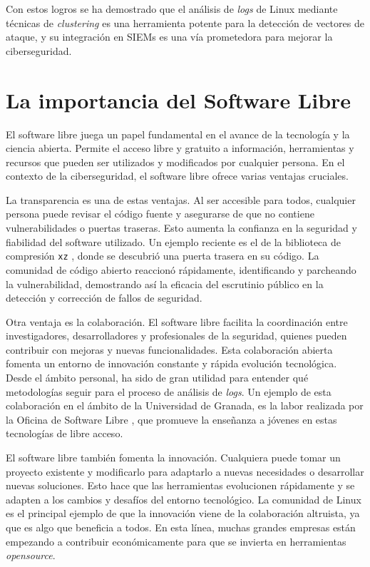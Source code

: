 Con estos logros se ha demostrado que el análisis de \textit{logs} de Linux mediante técnicas de \textit{clustering} es una herramienta potente para la detección de vectores de ataque, y su integración en \gls{SIEM}s es una vía prometedora para mejorar la ciberseguridad.


\newpage

\section{La importancia del Software Libre}

El software libre juega un papel fundamental en el avance de la tecnología y la ciencia abierta. Permite el acceso libre y gratuito a información, herramientas y recursos que pueden ser utilizados y modificados por cualquier persona. En el contexto de la ciberseguridad, el software libre ofrece varias ventajas cruciales.

La transparencia es una de estas ventajas. Al ser accesible para todos, cualquier persona puede revisar el código fuente y asegurarse de que no contiene vulnerabilidades o puertas traseras. Esto aumenta la confianza en la seguridad y fiabilidad del software utilizado. Un ejemplo reciente es el de la biblioteca de compresión \texttt{xz} \cite{goodin2024xzbackdoor}, donde se descubrió una puerta trasera en su código. La comunidad de código abierto reaccionó rápidamente, identificando y parcheando la vulnerabilidad, demostrando así la eficacia del escrutinio público en la detección y corrección de fallos de seguridad.

Otra ventaja es la colaboración. El software libre facilita la coordinación entre investigadores, desarrolladores y profesionales de la seguridad, quienes pueden contribuir con mejoras y nuevas funcionalidades. Esta colaboración abierta fomenta un entorno de innovación constante y rápida evolución tecnológica. Desde el ámbito personal, ha sido de gran utilidad para entender qué metodologías seguir para el proceso de análisis de \textit{logs}. Un ejemplo de esta colaboración en el ámbito de la Universidad de Granada, es la labor realizada por la Oficina de Software Libre \cite{oslugr}, que promueve la enseñanza a jóvenes en estas tecnologías de libre acceso.

El software libre también fomenta la innovación. Cualquiera puede tomar un proyecto existente y modificarlo para adaptarlo a nuevas necesidades o desarrollar nuevas soluciones. Esto hace que las herramientas evolucionen rápidamente y se adapten a los cambios y desafíos del entorno tecnológico. La comunidad de Linux es el principal ejemplo de que la innovación viene de la colaboración altruista, ya que es algo que beneficia a todos. En esta línea, muchas grandes empresas \cite{recluit2024opensource} están empezando a contribuir económicamente para que se invierta en herramientas \textit{opensource}.

